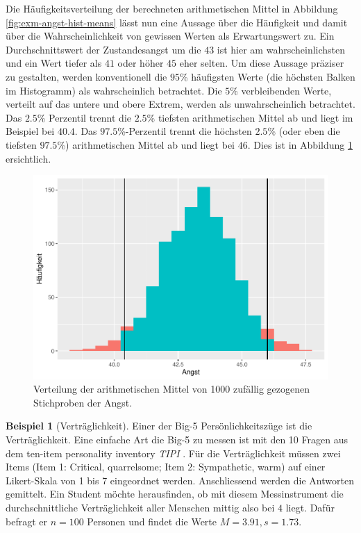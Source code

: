 \documentclass[
]{book}
\theoremstyle{definition}
\theoremstyle{definition}
\newtheorem{example}{Beispiel}[chapter]
\theoremstyle{definition}
\theoremstyle{definition}
\theoremstyle{remark}
\begin{document}
Die Häufigkeitsverteilung der berechneten arithmetischen Mittel in Abbildung \ref{fig:exm-angst-hist-means} lässt nun eine Aussage über die Häufigkeit und damit über die Wahrscheinlichkeit von gewissen Werten als Erwartungswert zu. Ein Durchschnittswert der Zustandesangst um die \(43\) ist hier am wahrscheinlichsten und ein Wert tiefer als \(41\) oder höher \(45\) eher selten. Um diese Aussage präziser zu gestalten, werden konventionell die \(95\)\% häufigsten Werte (die höchsten Balken im Histogramm) als wahrscheinlich betrachtet. Die \(5\)\% verbleibenden Werte, verteilt auf das untere und obere Extrem, werden als unwahrscheinlich betrachtet. Das \(2.5\)\% Perzentil trennt die \(2.5\)\% tiefsten arithmetischen Mittel ab und liegt im Beispiel bei \(40.4\). Das \(97.5\)\%-Perzentil trennt die höchsten \(2.5\)\% (oder eben die tiefsten \(97.5\)\%) arithmetischen Mittel ab und liegt bei \(46\). Dies ist in Abbildung \ref{fig:exm-angst-hist-means-emp-ci} ersichtlich.

\begin{figure}
\centering
\includegraphics{aps_statistik1_files/figure-latex/exm-angst-hist-means-emp-ci-1.pdf}
\caption{\label{fig:exm-angst-hist-means-emp-ci}Verteilung der arithmetischen Mittel von 1000 zufällig gezogenen Stichproben der Angst.}
\end{figure}

\begin{example}[Verträglichkeit]
\protect\hypertarget{exm:agreableness}{}\label{exm:agreableness}Einer der Big-5 Persönlichkeitszüge ist die Verträglichkeit. Eine einfache Art die Big-5 zu messen ist mit den 10 Fragen aus dem ten-item personality inventory \emph{TIPI} \citep{gosling2003}. Für die Verträglichkeit müssen zwei Items (Item 1: Critical, quarrelsome; Item 2: Sympathetic, warm) auf einer Likert-Skala von 1 bis 7 eingeordnet werden. Anschliessend werden die Antworten gemittelt. Ein Student möchte herausfinden, ob mit diesem Messinstrument die durchschnittliche Verträglichkeit aller Menschen mittig also bei \(4\) liegt. Dafür befragt er \(n = 100\) Personen und findet die Werte \(M=3.91, s = 1.73\).
\end{example}
\end{document}
